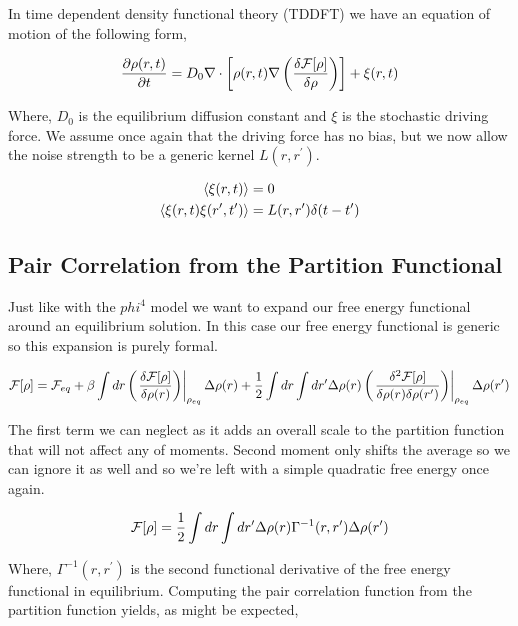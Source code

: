 In time dependent density functional theory (TDDFT) we have an equation of motion of the following form,

\begin{equation}
	\frac{\partial \rho(r, t)}{\partial t} = D_0 \nabla \cdot \left[\rho(r,t)\nabla \left(\frac{\delta \mathcal{F}[\rho]}{\delta \rho}\right)\right] + \xi(r, t)
\end{equation}

Where, $D_0$ is the equilibrium diffusion constant and $\xi$ is the stochastic driving force. We assume once again that the driving force has no bias, but we now allow the noise strength to be a generic kernel $L(r, r^\prime)$.

\begin{align}
	\langle \xi(r,t) \rangle &= 0 \\
	\left\langle \xi(r, t) \xi(r^\prime, t^\prime) \right\rangle &= L(r, r^\prime) \delta (t -t^\prime)
\end{align}

\subsection{Pair Correlation from the Partition Functional}

Just like with the $phi^4$ model we want to expand our free energy functional around an equilibrium solution. In this case our free energy functional is generic so this expansion is purely formal.

\begin{equation}
	\mathcal{F}[\rho] = \mathcal{F}_{eq} + \beta\int dr \left(\left.\frac{\delta \mathcal{F}[\rho]}{\delta \rho(r)}\right)\right\vert_{\rho_{eq}}\Delta\rho(r) + \frac{1}{2} \int dr \int dr^\prime \Delta\rho(r) \left(\left.\frac{\delta^2 \mathcal{F}[\rho]}{\delta \rho(r) \delta \rho(r^\prime)}\right)\right\vert_{\rho_{eq}} \Delta\rho(r^\prime)
\end{equation}

The first term we can neglect as it adds an overall scale to the partition function that will not affect any of moments. Second moment only shifts the average so we can ignore it as well and so we're left with a simple quadratic free energy once again.

\begin{equation}
	\mathcal{F}[\rho] = \frac{1}{2}\int dr \int dr^\prime \Delta \rho(r) \Gamma^{-1}(r, r^\prime) \Delta \rho(r^\prime)
\end{equation}

Where, $\Gamma^{-1}(r, r^\prime)$ is the second functional derivative of the free energy functional in equilibrium. Computing the pair correlation function from the partition function yields, as might be expected,

